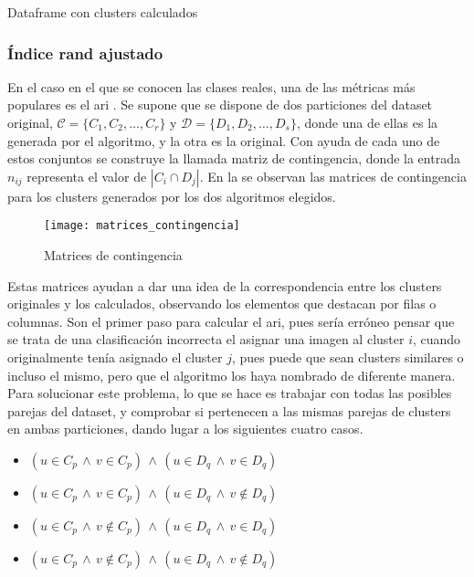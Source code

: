 				\begin{table}[!h]
					\tiny
					\centering
					\texttt{}
					\caption{Dataframe con clusters calculados}
					\label{tab:df_clusters}
				\end{table}
				
				\subsubsection{Índice rand ajustado}
				
					En el caso en el que se conocen las clases reales, una de las métricas más populares es el \gls{ari} \cite{ari}. Se supone que se dispone de dos particiones del dataset original, $\mathcal{C} = \{C_1, C_2, \ldots, C_r\}$ y $\mathcal{D} = \{D_1, D_2, \ldots, D_s\}$, donde una de ellas es la generada por el algoritmo, y la otra es la original. Con ayuda de cada uno de estos conjuntos se construye la llamada matriz de contingencia, donde la entrada $n_{ij}$ representa el valor de $|C_i \cap D_j|$. En la  se observan las matrices de contingencia para los clusters generados por los dos algoritmos elegidos. \\
					
					\begin{figure}[!h]
						\centering
						\texttt{[image: matrices\_contingencia]}
						\caption{Matrices de contingencia}
						\label{fig:matrices_contingencia}
					\end{figure} 
					
					Estas matrices ayudan a dar una idea de la correspondencia entre los clusters originales y los calculados, observando los elementos que destacan por filas o columnas. Son el primer paso para calcular el \gls{ari}, pues sería erróneo pensar que se trata de una clasificación incorrecta el asignar una imagen al cluster $i$, cuando originalmente tenía asignado el cluster $j$, pues puede que sean clusters similares o incluso el mismo, pero que el algoritmo los haya nombrado de diferente manera. Para solucionar este problema, lo que se hace es trabajar con todas las posibles parejas del dataset, y comprobar si pertenecen a las mismas parejas de clusters en ambas particiones, dando lugar a los siguientes cuatro casos. 
					
					\begin{itemize}
						\item $(u \in C_p \,\land\, v \in C_p) \,\land\, (u \in D_q \,\land\, v \in D_q)$
						\item  $(u \in C_p \,\land\, v \in C_p) \,\land\, (u \in D_q \,\land\, v \not\in D_q)$
						\item  $(u \in C_p \,\land\, v \not\in C_p) \,\land\, (u \in D_q \,\land\, v \in D_q)$
						\item  $(u \in C_p \,\land\, v \not\in C_p) \,\land\, (u \in D_q \,\land\, v \not\in D_q)$
					\end{itemize}
					
